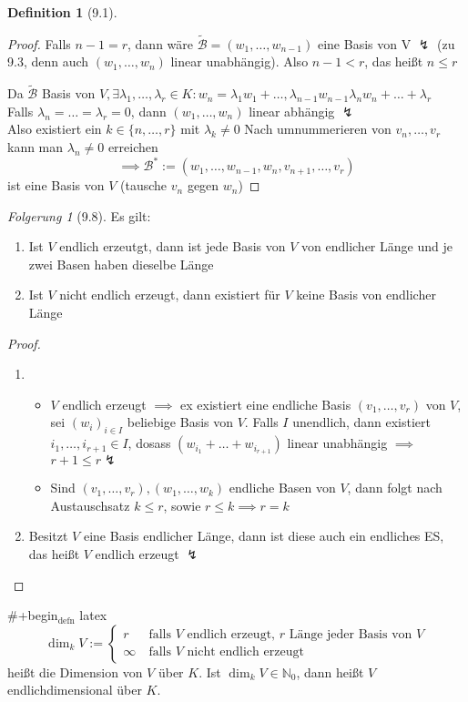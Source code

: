 \documentclass[a4paper]{scrartcl}
\DeclareMathOperator{\Exists}{\exists}
\theoremstyle{definition}
\newtheorem{defn}{Definition}
\theoremstyle{plain}
\theoremstyle{plain}
\theoremstyle{remark}
\theoremstyle{remark}
\theoremstyle{remark}
\newtheorem{conc}{Folgerung}
\theoremstyle{remark}
\theoremstyle{remark}
\begin{document}
\begin{defn}[9.1]
\begin{proof}
Falls $n - 1 = r$, dann wäre $\tilde{\mathcal{B}} = (w_1, \ldots, w_{n - 1})$ eine Basis von V $\lightning$ (zu 9.3, denn auch $(w_1, \ldots, w_n)$ linear unabhängig).
Also $n - 1 < r$, das heißt $n \leq r$

Da $\tilde{\mathcal{B}}$ Basis von $V, \Exists \lambda_1, \ldots, \lambda_r \in K: w_n = \lambda_1 w_1 + \ldots, \lambda_{n - 1} w_{n - 1} \lambda_n w_n + \ldots + \lambda_r$ \\
  Falls $\lambda_n = \ldots = \lambda_r = 0$, dann $(w_1, \ldots, w_n)$ linear abhängig $\lightning$ \\
  Also existiert ein $k \in \{n, \ldots, r\}$ mit $\lambda_k \neq 0$ Nach umnummerieren von $v_n, \ldots, v_r$ kann man $\lambda_n \neq 0$ erreichen
\[\implies \mathcal{B}^\ast := (w_1, \ldots, w_{n - 1}, w _n, v_{n + 1}, \ldots, v_r)\] ist eine Basis von $V$ (tausche $v_n$ gegen $w_n$)
\end{proof}
\begin{conc}[9.8]
Es gilt:
\begin{enumerate}
\item Ist $V$ endlich erzeutgt, dann ist jede Basis von $V$ von endlicher Länge und je zwei Basen haben dieselbe Länge
\item Ist $V$ nicht endlich erzeugt, dann existiert für $V$ keine Basis von endlicher Länge
\end{enumerate}
\end{conc}
\begin{proof}
\begin{enumerate}
\item \begin{itemize}
\item $V$ endlich erzeugt $\implies$ ex existiert eine endliche Basis $(v_1, \ldots, v_r)$ von $V$, sei $(w_i)_{i\in I}$ beliebige Basis von $V$. Falls $I$ unendlich, dann existiert $i_1, \ldots, i_{r + 1} \in I$, dosass $(w_{i_1} + \ldots + w_{i_{r + 1}})$
        linear unabhängig $\implies$ $r + 1 \leq r \lightning$
\item Sind $(v_1, \ldots, v_r), (w_1, \ldots, w_k)$ endliche Basen von $V$, dann folgt nach Austauschsatz $k \leq r$, sowie $r\leq k \implies r = k$
\end{itemize}
\item Besitzt $V$ eine Basis endlicher Länge, dann ist diese auch ein endliches ES, das heißt $V$ endlich erzeugt $\lightning$
\end{enumerate}
\end{proof}
\#+begin$_{\text{defn}}$ latex
\[\dim_k V := \begin{cases} r & ~\text{falls $V$ endlich erzeugt, $r$ Länge jeder Basis von $V$} \\ \infty & ~\text{falls $V$ nicht endlich erzeugt}\end{cases}\]
heißt die Dimension von $V$ über $K$. Ist $\dim_k V\in\mathbb{N}_0$, dann heißt $V$ endlichdimensional über $K$.
\end{defn}
\end{document}
